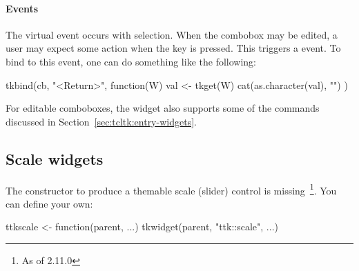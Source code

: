 \paragraph{Events}
The virtual event  occurs with
selection. When the combobox may be edited, a user may expect some
action when the  key is pressed. This triggers a
 event. To bind to this event, one can do something
like the following:

\begin{Schunk}
\begin{Sinput}
 tkbind(cb, "<Return>", function(W) {
   val <- tkget(W)
   cat(as.character(val), "\n")
 })
\end{Sinput}
\end{Schunk}

For editable comboboxes, the widget also supports some of the
 commands discussed in
Section~\ref{sec:tcltk:entry-widgets}.






\subsection{Scale widgets}
\label{sec:tcltk:scale-widgets}

The  constructor to produce a themable scale
(slider) control is missing~\footnote{As of \R{} 2.11.0}. You can define your own:
\begin{Schunk}
\begin{Sinput}
 ttkscale <- function(parent, ...) tkwidget(parent, "ttk::scale", ...)
\end{Sinput}
\end{Schunk}

